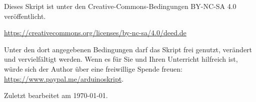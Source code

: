 Dieses Skript ist unter den Creative-Commons-Bedingungen BY-NC-SA 4.0 veröffentlicht.
	
\url{https://creativecommons.org/licenses/by-nc-sa/4.0/deed.de}

\medskip
Unter den dort angegebenen Bedingungen darf das Skript frei genutzt, verändert und vervielfältigt werden. Wenn es für Sie und Ihren Unterricht hilfreich ist, würde sich der Author über eine freiwillige Spende freuen: \url{https://www.paypal.me/arduinoskript}.
	
\vspace{\baselineskip}
	
Zuletzt bearbeitet am \today.

\newpage
{}
\onehalfspacing

\tableofcontents
\clearpage

{}
\setcounter{page}{1}






	










%

